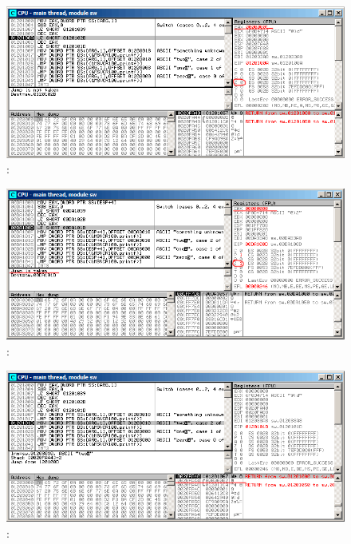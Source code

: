 \begin{figure}[H]
\centering
\includegraphics[scale=\FigScale]{patterns/08_switch/few_olly3.png}
\caption{\olly:  \DEC {}}
\label{fig:switch_few_olly3}
\end{figure}

\begin{figure}[H]
\centering
\includegraphics[scale=\FigScale]{patterns/08_switch/few_olly4.png}
\caption{\olly:  \DEC {}}
\label{fig:switch_few_olly4}
\end{figure}

\begin{figure}[H]
\centering
\includegraphics[scale=\FigScale]{patterns/08_switch/few_olly5.png}
\caption{\olly: 
}
\label{fig:switch_few_olly5}
\end{figure}

